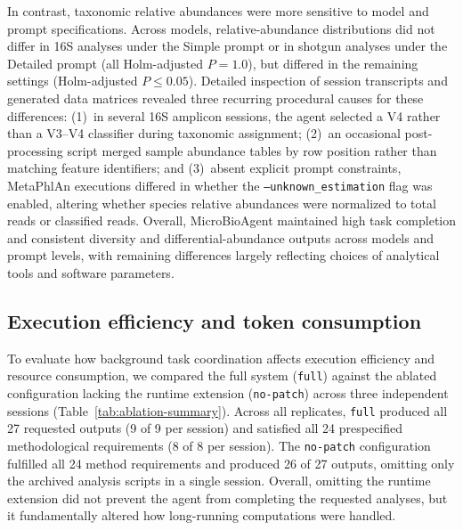 \documentclass[10pt,letterpaper]{article}
\begin{document}
In contrast, taxonomic relative abundances were more sensitive to model and
prompt specifications. Across models, relative-abundance distributions did
not differ in 16S analyses under the Simple prompt or in shotgun analyses
under the Detailed prompt (all Holm-adjusted $P = 1.0$), but differed in the
remaining settings (Holm-adjusted $P \le 0.05$). Detailed inspection of
session transcripts and generated data matrices revealed three recurring
procedural causes for these differences: (1)~in several 16S amplicon
sessions, the agent selected a V4 rather than a V3--V4 classifier during
taxonomic assignment; (2)~an occasional post-processing script merged sample
abundance tables by row position rather than matching feature identifiers;
and (3)~absent explicit prompt constraints, MetaPhlAn executions differed in
whether the \texttt{--unknown\_estimation} flag was enabled, altering whether
species relative abundances were normalized to total reads or classified
reads. Overall, MicroBioAgent maintained high task completion and consistent
diversity and differential-abundance outputs across models and prompt levels,
with remaining differences largely reflecting choices of analytical tools and
software parameters.

\subsection{Execution efficiency and token consumption}

To evaluate how background task coordination affects execution efficiency and
resource consumption, we compared the full system (\texttt{full}) against the
ablated configuration lacking the runtime extension
(\texttt{no-patch}) across three independent sessions
(Table~\ref{tab:ablation-summary}). Across all replicates, \texttt{full}
produced all 27 requested outputs (9 of 9 per session) and satisfied all 24
prespecified methodological requirements (8 of 8 per session). The
\texttt{no-patch} configuration fulfilled all 24 method requirements
and produced 26 of 27 outputs, omitting only the archived analysis scripts in
a single session. Overall, omitting the runtime extension did
not prevent the agent from completing the requested analyses, but it
fundamentally altered how long-running computations were handled.
\end{document}
